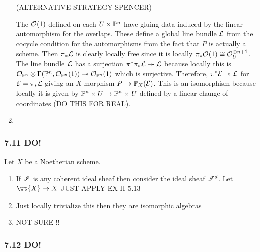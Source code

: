 \documentclass[12pt]{article}
\begin{document}
\begin{enumerate}
(ALTERNATIVE STRATEGY SPENCER)


The $\struct{}(1)$ defined on each $U \times \P^n$ have gluing data induced by the linear automorphism for the overlaps. These define a global line bundle $\L$ from the cocycle condition for the automorphisms from the fact that $P$ is actually a scheme. Then $\pi_* \L$ is clearly locally free since it is locally $\pi_* \struct{}(1) \cong \struct{U}^{\oplus n + 1}$. The line bundle $\L$ has a surjection $\pi^* \pi_* \L \onto \L$ because locally this is $\struct{\P^n} \ot \Gamma(\P^n, \struct{\P^n}(1)) \onto \struct{\P^n}(1)$ which is surjective. Therefore, $\pi^* \E \onto \L$ for $\E = \pi_* \L$ giving an $X$-morphism $P \to \P_X(\E)$. This is an isomorphism because locally it is given by $\P^n \times U \to \P^n \times U$ defined by a linear change of coordinates (DO THIS FOR REAL). 

\item 
\end{enumerate}

\subsubsection{7.11 DO!}

Let $X$ be a Noetherian scheme. 

\begin{enumerate}
\item If $\I$ is any coherent ideal sheaf then consider the ideal sheaf $\I^d$. Let $\wt{X} \to X$ JUST APPLY EX II 5.13

\item Just locally trivialize this then they are isomorphic algebras 

\item NOT SURE !!
\end{enumerate}


\subsubsection{7.12 DO!}
\end{document}
